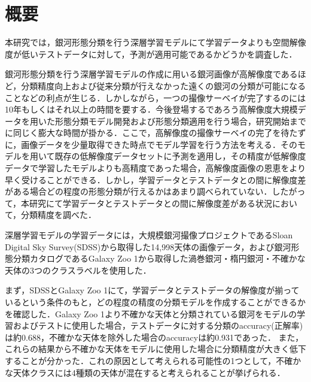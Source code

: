 \documentclass[a4j, 11pt]{jreport}
\begin{document}
\chapter*{概要}
本研究では，銀河形態分類を行う深層学習モデルにて学習データよりも空間解像度が低いテストデータに対して，予測が適用可能であるかどうかを調査した．

銀河形態分類を行う深層学習モデルの作成に用いる銀河画像が高解像度であるほど，分類精度向上および従来分類が行えなかった遠くの銀河の分類が可能になることなどの利点が生じる．しかしながら，一つの撮像サーベイが完了するのには10年もしくはそれ以上の時間を要する．今後登場するであろう高解像度大規模データを用いた形態分類モデル開発および形態分類適用を行う場合，研究開始までに同じく膨大な時間が掛かる．ここで，高解像度の撮像サーベイの完了を待たずに，画像データを少量取得できた時点でモデル学習を行う方法を考える．そのモデルを用いて既存の低解像度データセットに予測を適用し，その精度が低解像度データで学習したモデルよりも高精度であった場合，高解像度画像の恩恵をより早く受けることができる．しかし，学習データとテストデータとの間に解像度差がある場合どの程度の形態分類が行えるかはあまり調べられていない．したがって，本研究にて学習データとテストデータとの間に解像度差がある状況において，分類精度を調べた．

深層学習モデルの学習データには，大規模銀河撮像プロジェクトであるSloan Digital Sky Survey(SDSS)から取得した14,998天体の画像データ，および銀河形態分類カタログであるGalaxy Zoo 1から取得した渦巻銀河・楕円銀河・不確かな天体の3つのクラスラベルを使用した．

まず，SDSSとGalaxy Zoo 1にて，学習データとテストデータの解像度が揃っているという条件のもと，どの程度の精度の分類モデルを作成することができるかを確認した．Galaxy Zoo 1より不確かな天体と分類されている銀河をモデルの学習およびテストに使用した場合，テストデータに対する分類のaccuracy(正解率)は約0.688，不確かな天体を除外した場合のaccuracyは約0.931であった．
また，これらの結果から不確かな天体をモデルに使用した場合に分類精度が大きく低下することが分かった．これの原因として考えられる可能性の1つとして，不確かな天体クラスには4種類の天体が混在すると考えられることが挙げられる．

\end{document}
